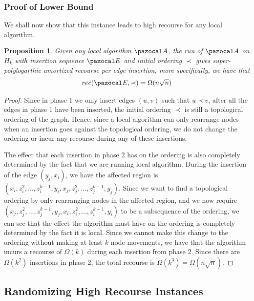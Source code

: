 \documentclass{report}
\newtheorem{proposition}[theorem]{Proposition}
\begin{document}
\subsubsection{Proof of Lower Bound}

We shall now show that this instance leads to high recourse for any local algorithm.

\begin{proposition}\label{locallowerbound} 
Given any local algorithm $\pazocal A$, the run of $\pazocal A$ on $H_k$ with insertion sequence $\pazocal E$ and initial ordering $\prec$ gives super-polylogarthic amortized recourse per edge insertion, more specifically, we have that
\[rec(\pazocal E, \prec) = \Omega(n \sqrt n)\]
\end{proposition}

\begin{proof}
Since in phase 1 we only insert edges $(u,v)$ such that $u \prec v$, after all the edges in phase 1 have been inserted, the initial ordering $\prec$ is still a topological ordering of the graph. Hence, since a local algorithm can only rearrange nodes when an insertion goes against the topological ordering, we do not change the ordering or incur any recourse during any of these insertions.

The effect that each insertion in phase 2 has on the ordering is also completely determined by the fact that we are running local algorithm. During the insertion of the edge $(y_j,x_i)$, we have the affected region is $(x_{i}, z_{i}^{2}, ..., z_{i}^{k-1}, y_{i},x_{j}, z_{j}^{2}, ..., z_{j}^{k-1}, y_{j})$. Since we want to find a topological ordering by only rearranging nodes in the affected region, and we now require $(x_{j}, z_{j}^{2}, ..., z_{j}^{k-1}, y_{j},x_{i}, z_{i}^{2}, ..., z_{i}^{k-1}, y_{i})$ to be a subsequence of the ordering, we can see that the effect the algorithm must have on the ordering is completely determined by the fact it is local. Since we cannot make this change to the ordering without making at least $k$ node movements, we have that the algorithm incurs a recourse of $\Omega(k)$ during each insertion from phase 2. Since there are $\Omega(k^2)$ insertions in phase 2, the total recourse is $\Omega(k^3) = \Omega(n\sqrt n)$.
\end{proof}

\subsection{Randomizing High Recourse Instances}
\end{document}
